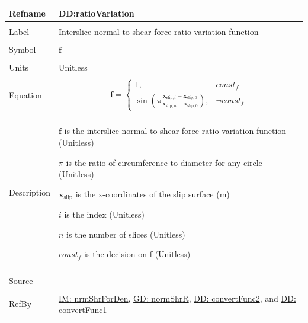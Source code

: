 \documentclass[12pt]{article}
\begin{document}
\noindent \begin{minipage}{\textwidth}
\begin{tabular}{>{\raggedright}p{}>{\raggedright\arraybackslash}p{}}
\toprule \textbf{Refname} & \textbf{DD:ratioVariation}
\label{DD:ratioVariation}
\\ \midrule \\
Label & Interslice normal to shear force ratio variation function
\\ \midrule \\
Symbol & $\mathbf{f}$
\\ \midrule \\
Units & Unitless
\\ \midrule \\
Equation & \begin{displaymath}
           \mathbf{f}=\begin{cases}
                      1, & const_f\\
\sin\left(π \frac{{\mathbf{x}_{\text{slip},i}}-{\mathbf{x}_{\text{slip},0}}}{{\mathbf{x}_{\text{slip},n}}-{\mathbf{x}_{\text{slip},0}}}\right), & \neg{}const_f
                      \end{cases}
           \end{displaymath}
\\ \midrule \\
Description & \begin{symbDescription}
              \item{$\mathbf{f}$ is the interslice normal to shear force ratio variation function (Unitless)}
              \item{$π$ is the ratio of circumference to diameter for any circle (Unitless)}
              \item{${\mathbf{x}_{\text{slip}}}$ is the x-coordinates of the slip surface (m)}
              \item{$i$ is the index (Unitless)}
              \item{$n$ is the number of slices (Unitless)}
              \item{$const_f$ is the decision on f (Unitless)}
              \end{symbDescription}
\\ \midrule \\
Source & \cite{fredlund1977}
\\ \midrule \\
RefBy & \hyperref[IM:nrmShrForDen]{IM: nrmShrForDen}, \hyperref[GD:normShrR]{GD: normShrR}, \hyperref[DD:convertFunc2]{DD: convertFunc2}, and \hyperref[DD:convertFunc1]{DD: convertFunc1}
\\ \bottomrule
\end{tabular}
\end{minipage}
\par~
\end{document}
